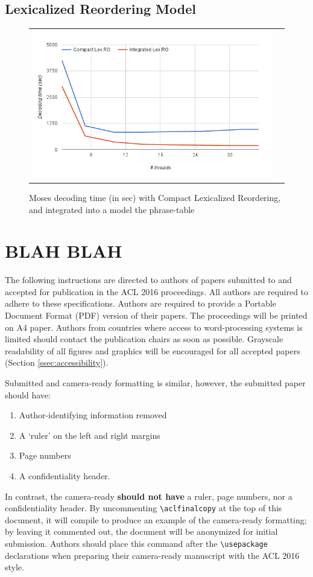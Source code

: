 \documentclass[11pt]{article}
\begin{document}
\subsection{Lexicalized Reordering Model}

\begin{figure}[h]
\centering
\begin{tabular}{cc}
{\includegraphics[scale=0.4]{lex-ro.png}} 
\end{tabular}
\caption{Moses decoding time (in sec) with Compact Lexicalized Reordering, and integrated into a model the phrase-table}
\label{fig:lex-ro}
\end{figure} 


\section{BLAH BLAH}

The following instructions are directed to authors of papers submitted to and accepted
for publication in the ACL 2016 proceedings.  All authors are required
to adhere to these specifications. Authors are required to provide 
a Portable Document Format (PDF) version of
their papers.  The proceedings will be printed on A4 paper.
Authors from countries where access to word-processing systems is
limited should contact the publication chairs as soon as possible.
 Grayscale readability of all figures and
graphics will be encouraged for all accepted papers
(Section \ref{ssec:accessibility}).  

Submitted and camera-ready formatting is similar,
  however, the submitted paper should have:
\begin{enumerate} 
\item Author-identifying information removed
\item A `ruler' on the left and right margins
\item Page numbers 
\item A confidentiality header.  
\end{enumerate}
In contrast, the camera-ready {\bf should  not have} a ruler, page numbers, nor a confidentiality header.  By uncommenting {\small\verb|\aclfinalcopy|} at the top of this 
 document, it will compile to produce an example of the camera-ready formatting; by leaving it commented out, the document will be anonymized for initial submission.  Authors should place this command after the {\small\verb|\usepackage|} declarations when preparing their camera-ready manuscript with the ACL 2016 style.
\end{document}
